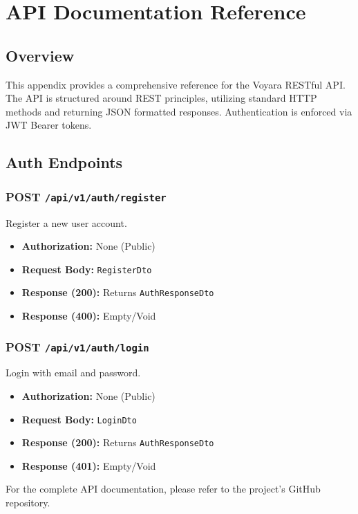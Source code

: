 \appendix
\chapter{API Documentation Reference}

\section{Overview}
This appendix provides a comprehensive reference for the Voyara RESTful API. The API is structured around REST principles, utilizing standard HTTP methods and returning JSON formatted responses. Authentication is enforced via JWT Bearer tokens.

\section{Auth Endpoints}

\subsection{POST \texttt{/api/v1/auth/register}}
Register a new user account.
\begin{itemize}
    \item \textbf{Authorization:} None (Public)
    \item \textbf{Request Body:} \texttt{RegisterDto}
    \item \textbf{Response (200):} Returns \texttt{AuthResponseDto}
    \item \textbf{Response (400):} Empty/Void
\end{itemize}

\subsection{POST \texttt{/api/v1/auth/login}}
Login with email and password.
\begin{itemize}
    \item \textbf{Authorization:} None (Public)
    \item \textbf{Request Body:} \texttt{LoginDto}
    \item \textbf{Response (200):} Returns \texttt{AuthResponseDto}
    \item \textbf{Response (401):} Empty/Void
\end{itemize}

For the complete API documentation, please refer to the project's GitHub repository.
